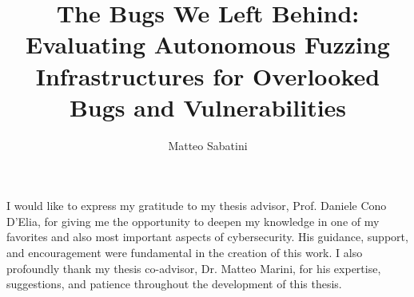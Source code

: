 \documentclass[binding=0.6cm, oneside]{sapthesis}%
\title{The Bugs We Left Behind: Evaluating Autonomous Fuzzing Infrastructures for Overlooked Bugs and Vulnerabilities}
\author{Matteo Sabatini}
\begin{document}
\frontmatter
\maketitle

\begin{acknowledgments}
I would like to express my gratitude to my thesis advisor, Prof. Daniele Cono D'Elia, for giving me the opportunity to deepen my knowledge in one of my favorites and also most important aspects of cybersecurity. His guidance, support, and encouragement were fundamental in the creation of this work.
\newline
I also profoundly thank my thesis co-advisor, Dr. Matteo Marini, for his expertise, suggestions, and patience throughout the development of this thesis.
\end{acknowledgments}
\end{document}
